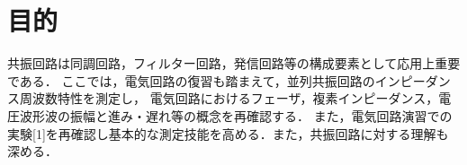 
\section{目的}

共振回路は同調回路，フィルター回路，発信回路等の構成要素として応用上重要である．
ここでは，電気回路の復習も踏まえて，並列共振回路のインピーダンス周波数特性を測定し，
電気回路におけるフェーザ，複素インピーダンス，電圧波形波の振幅と進み・遅れ等の概念を再確認する．
また，電気回路演習での実験[1]を再確認し基本的な測定技能を高める．また，共振回路に対する理解も深める．
